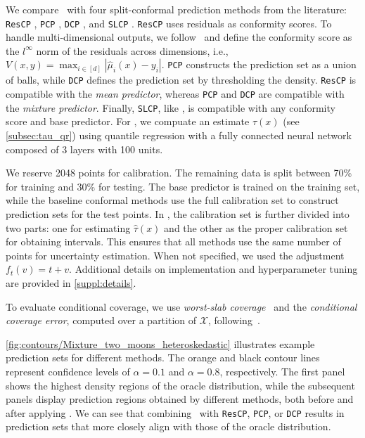   We compare \RCP\ with four split-conformal prediction methods from the literature: \texttt{ResCP} \citep{Diquigiovanni2021-bh}, \texttt{PCP} \citep{wang2023probabilistic}, \texttt{DCP} \citep{Sadinle2016-yr}, and \texttt{SLCP} \citep{han2022split}. \texttt{ResCP} uses residuals as conformity scores. To handle multi-dimensional outputs, we follow~\citep{Diquigiovanni2021-bh} and define the conformity score as the $l^\infty$ norm of the residuals across dimensions, i.e., \( V(x, y) = \max_{i \in [d]} |\hat{\mu}_i(x) - y_i| \). \texttt{PCP} constructs the prediction set as a union of balls, while \texttt{DCP} defines the prediction set by thresholding the density.  \texttt{ResCP} is compatible with the \textit{mean predictor}, whereas \texttt{PCP} and \texttt{DCP} are compatible with the \textit{mixture predictor}. Finally, \texttt{SLCP}, like \RCP, is compatible with any conformity score and base predictor. For \RCP, we compuate an estimate $\widehat{\tau}(x)$ (see \cref{subsec:tau_qr}) using quantile regression with a fully connected neural network composed of 3 layers with 100 units.
  

  We reserve 2048 points for calibration. The remaining data is split between 70\% for training and 30\% for testing. The base predictor is trained on the training set, while the baseline conformal methods use the full calibration set to construct prediction sets for the test points. In \RCP, the calibration set is further divided into two parts: one for estimating $\widehat{\tau}(x)$ and the other as the proper calibration set for obtaining intervals. This ensures that all methods use the same number of points for uncertainty estimation. When not specified, we used the adjustment $f_t(v) = t + v$. Additional details on implementation and hyperparameter tuning are provided in \cref{suppl:details}.

  To evaluate conditional coverage, we use \textit{worst-slab coverage}~\citep{cauchois2020knowing,romano2020classification} and the \textit{conditional coverage error}, computed over a partition of \(\mathcal{X}\), following~\citet{dheur2024distribution}.  

  \cref{fig:contours/Mixture_two_moons_heteroskedastic} illustrates example prediction sets for different methods. The orange and black contour lines represent confidence levels of \(\alpha = 0.1\) and \(\alpha = 0.8\), respectively. The first panel shows the highest density regions of the oracle distribution, while the subsequent panels display prediction regions obtained by different methods, both before and after applying \RCP. We can see that combining \RCP\ with \texttt{ResCP}, \texttt{PCP}, or \texttt{DCP} results in prediction sets that more closely align with those of the oracle distribution.

